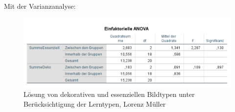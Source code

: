 Mit der Varianzanalyse:  

\begin{figure}[H]
\noindent\hspace{0.5mm}\includegraphics[width=15cm]{./Ressourcen/DekoEssGruppen.png}
\caption{Lösung von dekorativen und essenziellen Bildtypen unter Berücksichtigung der Lerntypen, Lorenz Müller}
\end{figure}


